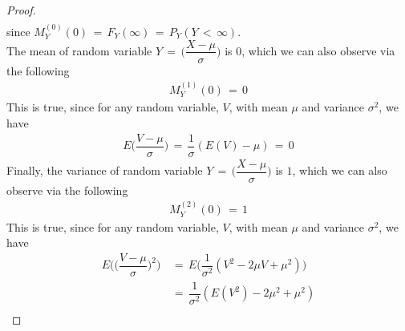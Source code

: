 \begin{theorem}
\begin{proof}
\begin{align*}
        \end{align*}
        since $M_{Y}^{(0)} (0) \hspace{2pt} = \hspace{2pt} F_{Y} (\infty) \hspace{2pt} = \hspace{2pt} P_{Y} (Y \hspace{2pt} < \hspace{2pt} \infty)$. \\[1ex]
        The mean of random variable $Y \hspace{2pt} = \hspace{2pt} \Big(\dfrac{X - \mu}{\sigma}\Big)$ is $0$, which we can also observe via the following
        \begin{align*}
            M_{Y}^{(1)} (0) \hspace{2pt} = \hspace{2pt} 0
        \end{align*}
        This is true, since for any random variable, $V$, with mean $\mu$ and variance $\sigma^{2}$, we have
        \begin{align*}
            E\Big(\dfrac{V - \mu}{\sigma}\Big) \hspace{2pt} = \hspace{2pt} \dfrac{1}{\sigma} (E(V) - \mu) \hspace{2pt} = \hspace{2pt} 0 
        \end{align*}
        Finally, the variance of random variable $Y \hspace{2pt} = \hspace{2pt} \Big(\dfrac{X - \mu}{\sigma}\Big)$ is $1$, which we can also observe via the following
        \begin{align*}
            M_{Y}^{(2)} (0) \hspace{2pt} = \hspace{2pt} 1
        \end{align*}
        This is true, since for any random variable, $V$, with mean $\mu$ and variance $\sigma^{2}$, we have
        \begin{align*}
            E\Big(\Big(\dfrac{V - \mu}{\sigma}\Big)^{2}\Big) \hspace{2pt} &= \hspace{2pt} E\Big(\dfrac{1}{\sigma^{2}}(V^{2} - 2\mu V + \mu^{2})\Big) \\[1ex]
            &= \hspace{2pt} \dfrac{1}{\sigma^{2}} (E(V^{2}) - 2\mu^{2} + \mu^{2}) \\[1ex]

\end{align*}
\end{proof}
\end{theorem}
